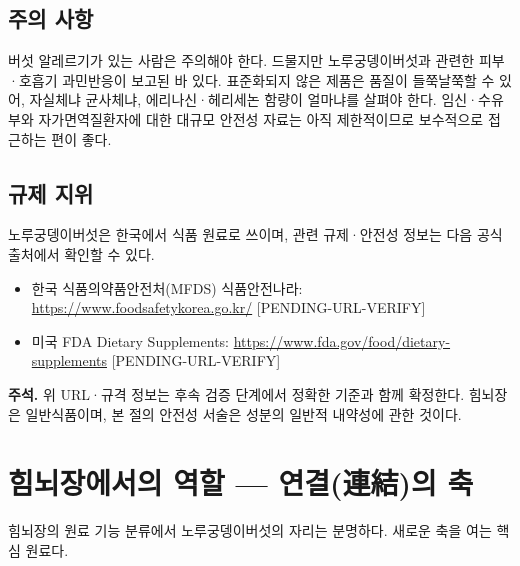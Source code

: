 \documentclass[12pt,oneside]{book}
\newenvironment{authnote}
  {\par\smallskip\begingroup\leftskip=6mm\rightskip=3mm\small\color{muted}\noindent\ignorespaces}
  {\par\endgroup\smallskip}
\begin{document}
\subsection{주의 사항}

버섯 알레르기가 있는 사람은 주의해야 한다. 드물지만 노루궁뎅이버섯과 관련한 피부·호흡기 과민반응이 보고된 바 있다. 표준화되지 않은 제품은 품질이 들쭉날쭉할 수 있어, 자실체냐 균사체냐, 에리나신·헤리세논 함량이 얼마냐를 살펴야 한다. 임신·수유부와 자가면역질환자에 대한 대규모 안전성 자료는 아직 제한적이므로 보수적으로 접근하는 편이 좋다.

\subsection{규제 지위}

노루궁뎅이버섯은 한국에서 식품 원료로 쓰이며, 관련 규제·안전성 정보는 다음 공식 출처에서 확인할 수 있다.

\begin{itemize}[leftmargin=6mm,itemsep=1pt,topsep=2pt]
  \item 한국 식품의약품안전처(MFDS) 식품안전나라: \url{https://www.foodsafetykorea.go.kr/} [PENDING-URL-VERIFY]
  \item 미국 FDA Dietary Supplements: \url{https://www.fda.gov/food/dietary-supplements} [PENDING-URL-VERIFY]
\end{itemize}

\begin{authnote}\textbf{주석.} 위 URL·규격 정보는 후속 검증 단계에서 정확한 기준과 함께 확정한다. 힘뇌장은 일반식품이며, 본 절의 안전성 서술은 성분의 일반적 내약성에 관한 것이다.\end{authnote}

\section{힘뇌장에서의 역할 — 연결(連結)의 축}

힘뇌장의 원료 기능 분류에서 노루궁뎅이버섯의 자리는 분명하다. 새로운 축을 여는 핵심 원료다.

\vspace{2pt}\vspace{3pt}
\end{document}
